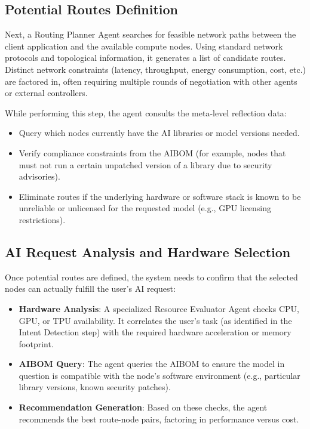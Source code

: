\subsection{Potential Routes Definition}

Next, a Routing Planner Agent searches for feasible network paths between the client application and the available compute nodes. Using standard network protocols and topological information, it generates a list of candidate routes. Distinct network constraints (latency, throughput, energy consumption, cost, etc.) are factored in, often requiring multiple rounds of negotiation with other agents or external controllers.

While performing this step, the agent consults the meta-level reflection data:
\begin{itemize}[leftmargin=*, label=--]
    \item Query which nodes currently have the AI libraries or model versions needed.
    \item Verify compliance constraints from the AIBOM (for example, nodes that must not run a certain unpatched version of a library due to security advisories).
    \item Eliminate routes if the underlying hardware or software stack is known to be unreliable or unlicensed for the requested model (e.g., GPU licensing restrictions).
\end{itemize}

\subsection{AI Request Analysis and Hardware Selection}

Once potential routes are defined, the system needs to confirm that the selected nodes can actually fulfill the user’s AI request:
\begin{itemize}[leftmargin=*, label=--]
    \item \textbf{Hardware Analysis}: A specialized Resource Evaluator Agent checks CPU, GPU, or TPU availability. It correlates the user’s task (as identified in the Intent Detection step) with the required hardware acceleration or memory footprint.
    \item \textbf{AIBOM Query}: The agent queries the AIBOM to ensure the model in question is compatible with the node’s software environment (e.g., particular library versions, known security patches).
    \item \textbf{Recommendation Generation}: Based on these checks, the agent recommends the best route-node pairs, factoring in performance versus cost.
\end{itemize}

